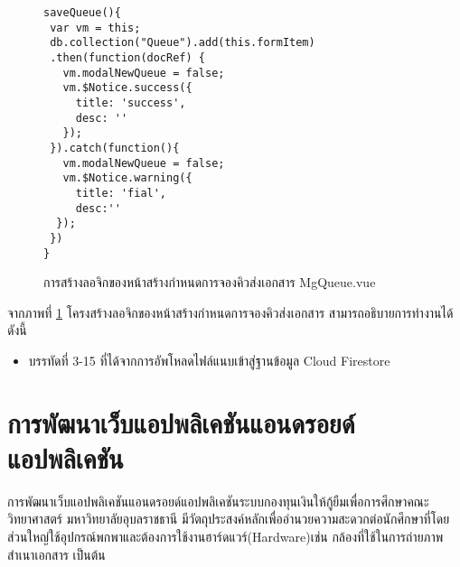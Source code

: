 		\begin{figure}[H]
			{\begin{lstlisting}
saveQueue(){
 var vm = this;
 db.collection("Queue").add(this.formItem)
 .then(function(docRef) {
   vm.modalNewQueue = false;
   vm.$Notice.success({
     title: 'success',
     desc: ''
   });
 }).catch(function(){
   vm.modalNewQueue = false;
   vm.$Notice.warning({
     title: 'fial',
     desc:''
  });
 })
}
				\end{lstlisting}}
			\caption{การสร้างลอจิกของหน้าสร้างกำหนดการจองคิวส่งเอกสาร MgQueue.vue}
			\label{Fig:MgQueueJs}
		\end{figure}
		จากภาพที่ \ref{Fig:MgQueueJs} โครงสร้างลอจิกของหน้าสร้างกำหนดการจองคิวส่งเอกสาร สามารถอธิบายการทำงานได้ดังนี้
		\begin{itemize}[label={--}]
			\item บรรทัดที่ 3-15 ที่ได้จากการอัพโหลดไฟล์แนบเข้าสู่ฐานข้อมูล Cloud Firestore
		\end{itemize}

\section{การพัฒนาเว็บแอปพลิเคชันแอนดรอยด์แอปพลิเคชัน}
		การพัฒนาเว็บแอปพลิเคชันแอนดรอยด์แอปพลิเคชันระบบกองทุนเงินให้กู้ยืมเพื่อการศึกษาคณะวิทยาศาสตร์ มหาวิทยาลัยอุบลราชธานี มีวัตถุประสงค์หลักเพื่ออำนวยความสะดวกต่อนักศึกษาที่โดยส่วนใหญ่ใช้อุปกรณ์พกพาและต้องการใช้งานฮาร์ดแวร์(Hardware)เช่น กล้องที่ใช้ในการถ่ายภาพสำเนาเอกสาร เป็นต้น
